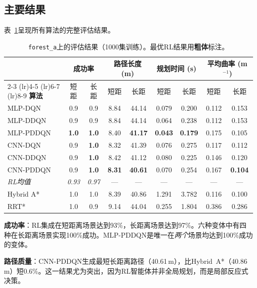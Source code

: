 \documentclass[conference]{IEEEtran}
\begin{document}
\subsection{主要结果}

表~\ref{tab:main_results}呈现所有算法的完整评估结果。

\begin{table}[t]
\centering
\caption{\texttt{forest\_a}上的评估结果（1000集训练）。最优RL结果用\textbf{粗体}标注。}
\label{tab:main_results}
\footnotesize
\begin{tabular}{@{}l cc cc cc cc@{}}
\toprule
& \multicolumn{2}{c}{\textbf{成功率}} & \multicolumn{2}{c}{\textbf{路径长度 (m)}} & \multicolumn{2}{c}{\textbf{规划时间 (s)}} & \multicolumn{2}{c}{\textbf{平均曲率 (m$^{-1}$)}} \\
\cmidrule(lr){2-3} \cmidrule(lr){4-5} \cmidrule(lr){6-7} \cmidrule(lr){8-9}
\textbf{算法} & 短距 & 长距 & 短距 & 长距 & 短距 & 长距 & 短距 & 长距 \\
\midrule
MLP-DQN    & 0.9 & 0.9 & 8.84 & 44.14 & 0.079 & 0.200 & 0.112 & 0.153 \\
MLP-DDQN   & 0.9 & 0.9 & 8.84 & 44.14 & 0.064 & 0.238 & 0.112 & 0.153 \\
MLP-PDDQN  & \textbf{1.0} & \textbf{1.0} & 8.40 & \textbf{41.17} & \textbf{0.043} & \textbf{0.179} & 0.175 & 0.105 \\
CNN-DQN    & 0.9 & \textbf{1.0} & 8.32 & 41.39 & 0.076 & 0.275 & 0.117 & 0.112 \\
CNN-DDQN   & 0.9 & \textbf{1.0} & 8.42 & 41.12 & 0.080 & 0.225 & 0.146 & 0.120 \\
CNN-PDDQN  & 0.9 & \textbf{1.0} & \textbf{8.31} & \textbf{40.61} & 0.070 & 0.254 & 0.167 & \textbf{0.104} \\
\midrule
\textit{RL均值}  & \textit{0.93} & \textit{0.97} & --- & --- & --- & --- & --- & --- \\
\midrule
Hybrid A*  & 1.0 & 1.0 & 8.39 & 40.86 & 1.291 & 3.782 & 0.116 & 0.100 \\
RRT*       & 1.0 & 0.9 & 9.14 & 44.04 & 0.255 & 1.804 & 0.386 & 0.286 \\
\bottomrule
\end{tabular}
\end{table}

\textbf{成功率}：RL集成在短距离场景达到93\%，长距离场景达到97\%。六种变体中有四种在长距离场景实现100\%成功。MLP-PDDQN是唯一在\emph{两个}场景均达到100\%成功的变体。

\textbf{路径质量}：CNN-PDDQN生成最短长距离路径（40.61\,m），比Hybrid~A*（40.86\,m）短0.6\%。这一结果尤为突出，因为RL智能体并非全局规划，而是局部反应式决策。
\end{document}
